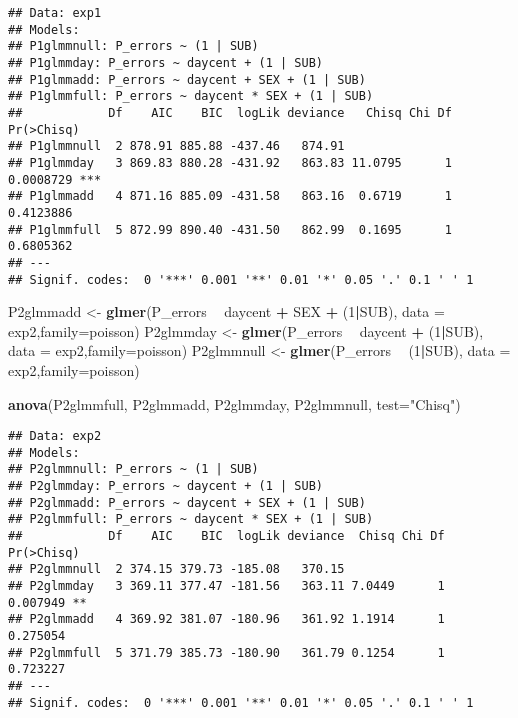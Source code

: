 \documentclass[]{article}
\newenvironment{Shaded}{\begin{snugshade}}{\end{snugshade}}
\newcommand{\KeywordTok}[1]{\textcolor[rgb]{0.13,0.29,0.53}{\textbf{#1}}}
\newcommand{\DataTypeTok}[1]{\textcolor[rgb]{0.13,0.29,0.53}{#1}}
\newcommand{\DecValTok}[1]{\textcolor[rgb]{0.00,0.00,0.81}{#1}}
\newcommand{\StringTok}[1]{\textcolor[rgb]{0.31,0.60,0.02}{#1}}
\newcommand{\OperatorTok}[1]{\textcolor[rgb]{0.81,0.36,0.00}{\textbf{#1}}}
\newcommand{\NormalTok}[1]{#1}
\begin{document}
\begin{verbatim}
## Data: exp1
## Models:
## P1glmmnull: P_errors ~ (1 | SUB)
## P1glmmday: P_errors ~ daycent + (1 | SUB)
## P1glmmadd: P_errors ~ daycent + SEX + (1 | SUB)
## P1glmmfull: P_errors ~ daycent * SEX + (1 | SUB)
##            Df    AIC    BIC  logLik deviance   Chisq Chi Df Pr(>Chisq)    
## P1glmmnull  2 878.91 885.88 -437.46   874.91                              
## P1glmmday   3 869.83 880.28 -431.92   863.83 11.0795      1  0.0008729 ***
## P1glmmadd   4 871.16 885.09 -431.58   863.16  0.6719      1  0.4123886    
## P1glmmfull  5 872.99 890.40 -431.50   862.99  0.1695      1  0.6805362    
## ---
## Signif. codes:  0 '***' 0.001 '**' 0.01 '*' 0.05 '.' 0.1 ' ' 1
\end{verbatim}

\begin{Shaded}
\begin{Highlighting}[]
\NormalTok{P2glmmadd <-}\StringTok{ }\KeywordTok{glmer}\NormalTok{(P_errors }\OperatorTok{~}\StringTok{ }\NormalTok{daycent }\OperatorTok{+}\StringTok{ }\NormalTok{SEX }\OperatorTok{+}\StringTok{ }\NormalTok{(}\DecValTok{1}\OperatorTok{|}\NormalTok{SUB), }\DataTypeTok{data =}\NormalTok{ exp2,}\DataTypeTok{family=}\NormalTok{poisson)}
\NormalTok{P2glmmday <-}\StringTok{ }\KeywordTok{glmer}\NormalTok{(P_errors }\OperatorTok{~}\StringTok{ }\NormalTok{daycent }\OperatorTok{+}\StringTok{ }\NormalTok{(}\DecValTok{1}\OperatorTok{|}\NormalTok{SUB), }\DataTypeTok{data =}\NormalTok{ exp2,}\DataTypeTok{family=}\NormalTok{poisson)}
\NormalTok{P2glmmnull <-}\StringTok{ }\KeywordTok{glmer}\NormalTok{(P_errors }\OperatorTok{~}\StringTok{ }\NormalTok{(}\DecValTok{1}\OperatorTok{|}\NormalTok{SUB), }\DataTypeTok{data =}\NormalTok{ exp2,}\DataTypeTok{family=}\NormalTok{poisson)}

\KeywordTok{anova}\NormalTok{(P2glmmfull, P2glmmadd, P2glmmday, P2glmmnull, }\DataTypeTok{test=}\StringTok{"Chisq"}\NormalTok{)}
\end{Highlighting}
\end{Shaded}

\begin{verbatim}
## Data: exp2
## Models:
## P2glmmnull: P_errors ~ (1 | SUB)
## P2glmmday: P_errors ~ daycent + (1 | SUB)
## P2glmmadd: P_errors ~ daycent + SEX + (1 | SUB)
## P2glmmfull: P_errors ~ daycent * SEX + (1 | SUB)
##            Df    AIC    BIC  logLik deviance  Chisq Chi Df Pr(>Chisq)   
## P2glmmnull  2 374.15 379.73 -185.08   370.15                            
## P2glmmday   3 369.11 377.47 -181.56   363.11 7.0449      1   0.007949 **
## P2glmmadd   4 369.92 381.07 -180.96   361.92 1.1914      1   0.275054   
## P2glmmfull  5 371.79 385.73 -180.90   361.79 0.1254      1   0.723227   
## ---
## Signif. codes:  0 '***' 0.001 '**' 0.01 '*' 0.05 '.' 0.1 ' ' 1
\end{verbatim}
\end{document}

